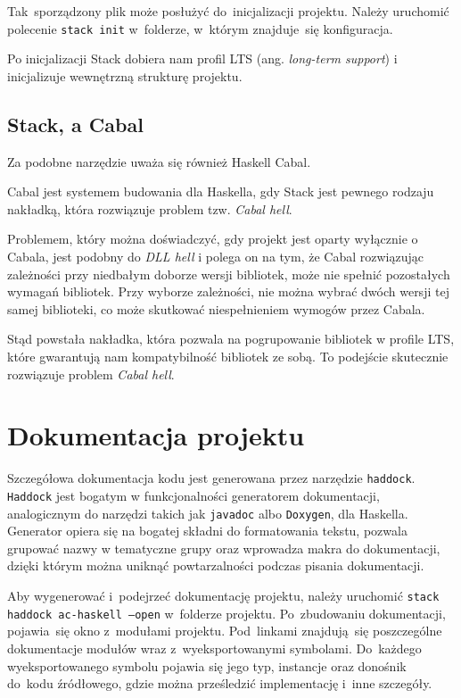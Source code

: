 \documentclass[../../praca.tex]{subfiles}
\begin{document}
Tak~sporządzony plik może posłużyć do~inicjalizacji projektu.
Należy uruchomić polecenie \texttt{stack init} w~folderze,
w~którym znajduje~się konfiguracja.

Po inicjalizacji Stack dobiera nam profil LTS (ang. \emph{long-term support})
i inicjalizuje wewnętrzną strukturę projektu. 

\subsection{Stack, a Cabal}

Za podobne narzędzie uważa się również Haskell Cabal.

Cabal jest systemem budowania dla Haskella, gdy Stack jest pewnego rodzaju nakładką,
która rozwiązuje problem tzw. \emph{Cabal hell}.

Problemem, który można doświadczyć, gdy projekt jest oparty wyłącznie o Cabala,
jest podobny do \emph{DLL hell} i polega on na tym, że Cabal rozwiązując zależności
przy niedbałym doborze wersji bibliotek, może nie spełnić pozostałych wymagań
bibliotek. Przy wyborze zależności, nie można wybrać dwóch
wersji tej samej biblioteki, co może skutkować niespełnieniem wymogów przez Cabala.

Stąd powstała nakładka, która pozwala na pogrupowanie bibliotek w profile LTS,
które gwarantują nam kompatybilność bibliotek ze sobą. To podejście skutecznie rozwiązuje
problem \emph{Cabal hell}.

\section{Dokumentacja projektu}

Szczegółowa dokumentacja kodu jest generowana przez narzędzie \texttt{haddock}.
\texttt{Haddock} jest bogatym w funkcjonalności generatorem dokumentacji, 
analogicznym do narzędzi takich jak \texttt{javadoc} albo \texttt{Doxygen}, dla Haskella. 
Generator opiera się na bogatej składni
do formatowania tekstu, pozwala grupować nazwy w tematyczne grupy oraz
wprowadza makra do dokumentacji, dzięki którym można uniknąć powtarzalności podczas
pisania dokumentacji.

Aby wygenerować i~podejrzeć dokumentację projektu, należy uruchomić \texttt{stack haddock
ac-haskell --open} w~folderze projektu. Po~zbudowaniu dokumentacji, pojawia~się
okno z~modułami projektu. Pod~linkami znajdują~się poszczególne dokumentacje
modułów wraz z~wyeksportowanymi symbolami. Do~każdego wyeksportowanego
symbolu pojawia się jego typ, instancje oraz donośnik do~kodu źródłowego,
gdzie można prześledzić implementację i~inne szczegóły.
\end{document}
